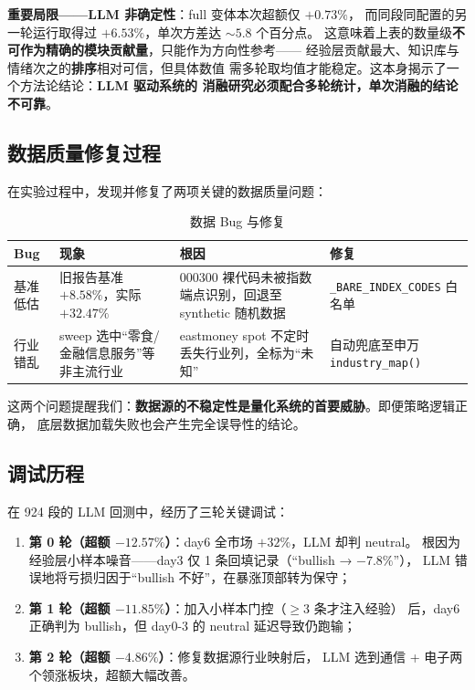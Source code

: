 \documentclass[a4paper,11pt]{article}
\begin{document}
\textbf{重要局限——LLM 非确定性}：full 变体本次超额仅 $+0.73\%$，
而同段同配置的另一轮运行取得过 $+6.53\%$，单次方差达 $\sim 5.8$ 个百分点。
这意味着上表的数量级\textbf{不可作为精确的模块贡献量}，只能作为方向性参考——
经验层贡献最大、知识库与情绪次之的\textbf{排序}相对可信，但具体数值
需多轮取均值才能稳定。这本身揭示了一个方法论结论：\textbf{LLM 驱动系统的
消融研究必须配合多轮统计，单次消融的结论不可靠}。

\subsection{数据质量修复过程}

在实验过程中，发现并修复了两项关键的数据质量问题：

\begin{table}[H]
\centering
\caption{数据 Bug 与修复}
\begin{tabularx}{0.96\linewidth}{l X X X}
\toprule
Bug & 现象 & 根因 & 修复 \\
\midrule
基准低估 & 旧报告基准 $+8.58\%$，实际 $+32.47\%$ & 000300 裸代码未被指数端点识别，回退至 synthetic 随机数据 & \texttt{\_BARE\_INDEX\_CODES} 白名单 \\
行业错乱 & sweep 选中``零食/金融信息服务''等非主流行业 & eastmoney spot 不定时丢失行业列，全标为``未知'' & 自动兜底至申万 \texttt{industry\_map()} \\
\bottomrule
\end{tabularx}
\label{tab:bugs}
\end{table}

这两个问题提醒我们：\textbf{数据源的不稳定性是量化系统的首要威胁}。即便策略逻辑正确，
底层数据加载失败也会产生完全误导性的结论。

\subsection{调试历程}

在 924 段的 LLM 回测中，经历了三轮关键调试：

\begin{enumerate}
    \item \textbf{第 0 轮（超额 $-12.57\%$）}：day6 全市场 $+32\%$，LLM 却判 neutral。
    根因为经验层小样本噪音——day3 仅 1 条回填记录（``bullish → $-7.8\%$''），
    LLM 错误地将亏损归因于``bullish 不好''，在暴涨顶部转为保守；
    \item \textbf{第 1 轮（超额 $-11.85\%$）}：加入小样本门控（$\geq 3$ 条才注入经验）
    后，day6 正确判为 bullish，但 day0-3 的 neutral 延迟导致仍跑输；
    \item \textbf{第 2 轮（超额 $-4.86\%$）}：修复数据源行业映射后，
    LLM 选到通信 + 电子两个领涨板块，超额大幅改善。
\end{enumerate}
\end{document}
